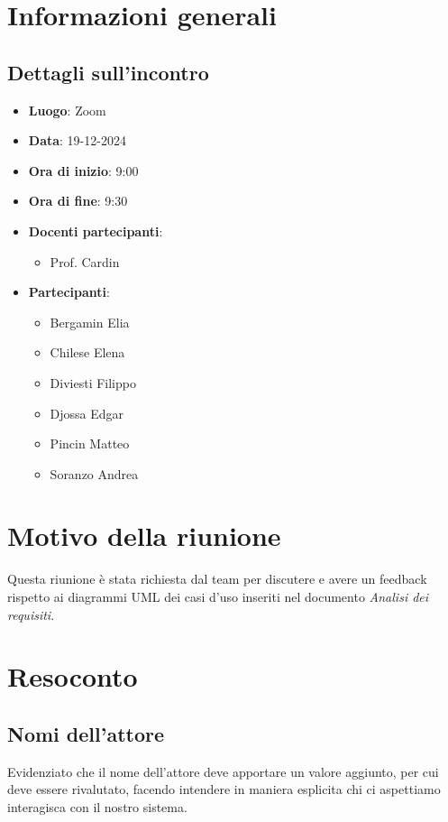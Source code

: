 \section{Informazioni generali}
\subsection{Dettagli sull'incontro}
\begin{itemize}
    \item \textbf{Luogo}: Zoom
    \item \textbf{Data}: 19-12-2024
    \item \textbf{Ora di inizio}: 9:00
    \item \textbf{Ora di fine}: 9:30
    \item \textbf{Docenti partecipanti}: 
    \begin{itemize}
        \item Prof. Cardin
    \end{itemize}
    \item \textbf{Partecipanti}:
    \begin{itemize}
        \item Bergamin Elia
        \item Chilese Elena
        \item Diviesti Filippo
        \item Djossa Edgar
        \item Pincin Matteo 
        \item Soranzo Andrea  
    \end{itemize}
\end{itemize}

\section{Motivo della riunione}
Questa riunione è stata richiesta dal team per discutere e avere un feedback rispetto ai diagrammi UML dei casi d'uso inseriti nel documento \textit{Analisi dei requisiti}.

\section{Resoconto}
\subsection{Nomi dell'attore}
Evidenziato che il nome dell'attore deve apportare un valore aggiunto, per cui deve essere rivalutato, facendo intendere in maniera esplicita chi ci aspettiamo interagisca con il nostro sistema.

